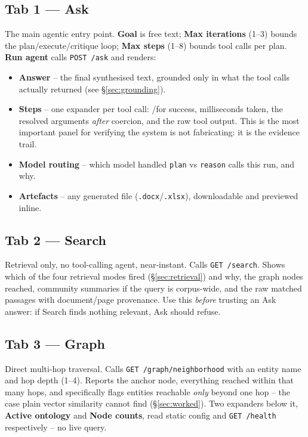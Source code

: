 \documentclass[11pt,a4paper]{article}
\newcommand{\code}[1]{\texttt{\small #1}}
\newcommand{\tick}{{\color{accent2}\textbf{\checkmark}}}
\newcommand{\cross}{{\color{warn}\textbf{\texttimes}}}
\newcommand{\term}[1]{\textbf{\color{accent}#1}}
\begin{document}
\subsection{Tab 1 --- Ask}

The main agentic entry point. \term{Goal} is free text; \term{Max iterations}
(1--3) bounds the plan/execute/critique loop; \term{Max steps} (1--8) bounds
tool calls per plan. \term{Run agent} calls \code{POST /ask} and renders:

\begin{itemize}
  \item \textbf{Answer} -- the final synthesised text, grounded only in what
        the tool calls actually returned (see \S\ref{sec:grounding}).
  \item \textbf{Steps} -- one expander per tool call: \tick/\cross for success,
        milliseconds taken, the resolved arguments \emph{after} coercion, and
        the raw tool output. This is the most important panel for verifying
        the system is not fabricating: it is the evidence trail.
  \item \textbf{Model routing} -- which model handled \code{plan} vs
        \code{reason} calls this run, and why.
  \item \textbf{Artefacts} -- any generated file (\code{.docx}/\code{.xlsx}),
        downloadable and previewed inline.
\end{itemize}

\subsection{Tab 2 --- Search}

Retrieval only, no tool-calling agent, near-instant. Calls \code{GET /search}.
Shows which of the four retrieval modes fired (\S\ref{sec:retrieval}) and why,
the graph nodes reached, community summaries if the query is corpus-wide, and
the raw matched passages with document/page provenance. Use this \emph{before}
trusting an Ask answer: if Search finds nothing relevant, Ask should refuse.

\subsection{Tab 3 --- Graph}

Direct multi-hop traversal. Calls \code{GET /graph/neighborhood} with an
entity name and hop depth (1--4). Reports the anchor node, everything reached
within that many hops, and specifically flags entities reachable \emph{only}
beyond one hop -- the case plain vector similarity cannot find (\S\ref{sec:worked}).
Two expanders below it, \term{Active ontology} and \term{Node counts}, read
static config and \code{GET /health} respectively -- no live query.
\end{document}
